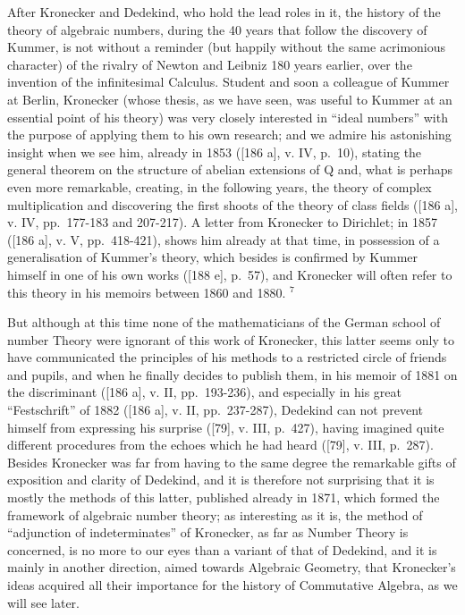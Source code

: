 After Kronecker and Dedekind, who hold the lead roles in it, the history of the theory of algebraic numbers, during the 40 years that follow the discovery of Kummer, is not without a reminder (but happily without the same acrimonious character) of the rivalry of Newton and Leibniz 180 years earlier, over the invention of the infinitesimal Calculus. Student and soon a colleague of Kummer at Berlin, Kronecker (whose thesis, as we have seen, was useful to Kummer at an essential point of his theory) was very closely interested in ``ideal numbers'' with the purpose of applying them to his own research; and we admire his astonishing insight when we see him, already in 1853 ({[}186 a{]}, v. IV, p.~10), stating the general theorem on the structure of abelian extensions of Q and, what is perhaps even more remarkable, creating, in the following years, the theory of complex multiplication and discovering the first shoots of the theory of class fields ({[}186 a{]}, v. IV, pp.~177-183 and 207-217). A letter from Kronecker to Dirichlet; in 1857 ({[}186 a{]}, v. V, pp.~418-421), shows him already at that time, in possession of a generalisation of Kummer's theory, which besides is confirmed by Kummer himself in one of his own works ({[}188 e{]}, p.~57), and Kronecker will often refer to this theory in his memoirs between 1860 and 1880. \(^{7}\)

But although at this time none of the mathematicians of the German school of number Theory were ignorant of this work of Kronecker, this latter seems only to have communicated the principles of his methods to a restricted circle of friends and pupils, and when he finally decides to publish them, in his memoir of 1881 on the discriminant ({[}186 a{]}, v. II, pp.~193-236), and especially in his great ``Festschrift'' of 1882 ({[}186 a{]}, v. II, pp.~237-287), Dedekind can not prevent himself from expressing his surprise ({[}79{]}, v. III, p.~427), having imagined quite different procedures from the echoes which he had heard ({[}79{]}, v. III, p.~287). Besides Kronecker was far from having to the same degree the remarkable gifts of exposition and clarity of Dedekind, and it is therefore not surprising that it is mostly the methods of this latter, published already in 1871, which formed the framework of algebraic number theory; as interesting as it is, the method of ``adjunction of indeterminates'' of Kronecker, as far as Number Theory is concerned, is no more to our eyes than a variant of that of Dedekind, and it is mainly in another direction, aimed towards Algebraic Geometry, that Kronecker's ideas acquired all their importance for the history of Commutative Algebra, as we will see later.

